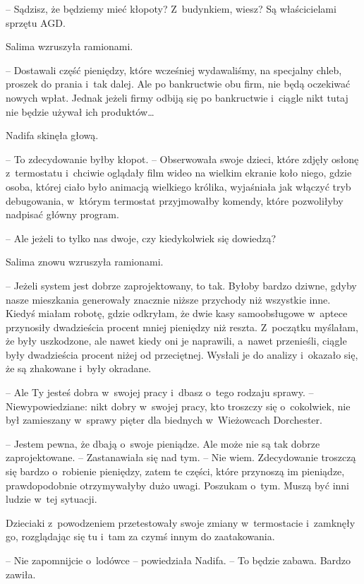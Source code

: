 \documentclass[oneside,polish,11pt,sfheadings]{mwbk}
\begin{document}
-- Sądzisz, że będziemy mieć kłopoty? Z~budynkiem, wiesz? Są
właścicielami sprzętu AGD.

Salima wzruszyła ramionami. 

-- Dostawali część pieniędzy, które wcześniej
wydawaliśmy, na specjalny chleb, proszek do prania i~tak dalej. Ale po
bankructwie obu firm, nie będą oczekiwać nowych wpłat. Jednak jeżeli
firmy odbiją się po bankructwie i~ciągle nikt tutaj nie będzie używał
ich produktów\ldots 

Nadifa skinęła głową. 

-- To zdecydowanie byłby kłopot. -- Obserwowała
swoje dzieci, które zdjęły osłonę z~termostatu i~chciwie oglądały film
wideo na wielkim ekranie koło niego, gdzie osoba, której ciało było
animacją wielkiego królika, wyjaśniała jak włączyć tryb debugowania, w~którym termostat przyjmowałby komendy, które pozwoliłyby nadpisać główny
program. 

-- Ale jeżeli to tylko nas dwoje, czy kiedykolwiek się dowiedzą?

Salima znowu wzruszyła ramionami. 

-- Jeżeli system jest dobrze
zaprojektowany, to tak. Byłoby bardzo dziwne, gdyby nasze mieszkania
generowały znacznie niższe przychody niż wszystkie inne. Kiedyś miałam
robotę, gdzie odkryłam, że dwie kasy samoobsługowe w~aptece przynosiły
dwadzieścia procent mniej pieniędzy niż reszta. Z~początku myślałam, że
były uszkodzone, ale nawet kiedy oni je naprawili, a~nawet przenieśli,
ciągle były dwadzieścia procent niżej od przeciętnej. Wysłali je do
analizy i~okazało się, że są zhakowane i~były okradane.

-- Ale Ty jesteś dobra w~swojej pracy i~dbasz o~tego rodzaju sprawy. -- Niewypowiedziane: nikt dobry w~swojej pracy, kto troszczy się o~cokolwiek, nie był zamieszany w~sprawy pięter dla biednych w~Wieżowcach
Dorchester.

-- Jestem pewna, że dbają o~swoje pieniądze. Ale może nie są tak dobrze
zaprojektowane. -- Zastanawiała się nad tym. -- Nie wiem. Zdecydowanie
troszczą się bardzo o~robienie pieniędzy, zatem te części, które
przynoszą im pieniądze, prawdopodobnie otrzymywałyby dużo uwagi.
Poszukam o~tym. Muszą być inni ludzie w~tej sytuacji.

Dzieciaki z~powodzeniem przetestowały swoje zmiany w~termostacie i~zamknęły go, rozglądając się tu i~tam za czymś innym do zaatakowania.

-- Nie zapomnijcie o~lodówce -- powiedziała Nadifa. -- To będzie zabawa.
Bardzo zawiła.
\end{document}
